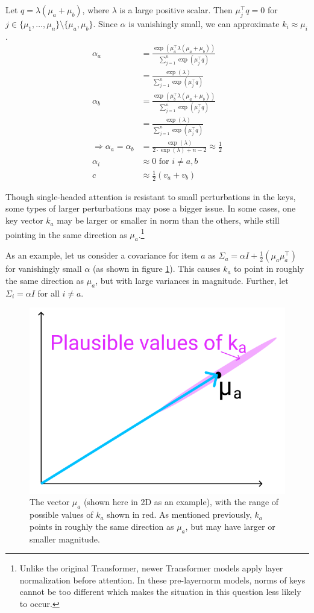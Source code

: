 \begin{parts}
\begin{subparts}
\ifans{} Let $q = \lambda(\mu_a + \mu_b)$, where $\lambda$ is a large positive scalar. Then $\mu_j^\top q = 0$ for $j \in \{\mu_1, \ldots, \mu_n\} \setminus \{\mu_a, \mu_b\}$. 
Since $\alpha$ is vanishingly small, we can approximate $k_i \approx \mu_i$.
\begin{align*}
    \alpha_a &= \frac{\exp(\mu_a^\top \lambda (\mu_a + \mu_b))}{\sum_{j=1}^{n} \exp(\mu_j^\top q)} \\
    &= \frac{\exp(\lambda)}{\sum_{j=1}^{n} \exp(\mu_j^\top q)} \\
    \alpha_b &= \frac{\exp(\mu_b^\top \lambda (\mu_a + \mu_b))}{\sum_{j=1}^{n} \exp(\mu_j^\top q)} \\
    &= \frac{\exp(\lambda)}{\sum_{j=1}^{n} \exp(\mu_j^\top q)} \\
    \Rightarrow \alpha_a = \alpha_b &= \frac{\exp(\lambda)}{2 \cdot \exp(\lambda) + n - 2} \approx \frac{1}{2}\\
    \alpha_i &\approx 0 \textrm{ for } i \neq a, b \\
    c &\approx \frac{1}{2} (v_a + v_b)
\end{align*}

\subpart[3] Though single-headed attention is resistant to small perturbations in the keys, some types of larger perturbations may pose a bigger issue. In some cases, one key vector $k_a$ may be larger or smaller in norm than the others, while still pointing in the same direction as $\mu_a$.\footnote{Unlike the original Transformer, newer Transformer models apply layer normalization before attention. In these pre-layernorm models, norms of keys cannot be too different which makes the situation in this question less likely to occur.}

As an example, let us consider a covariance for item $a$ as $\Sigma_a = \alpha I + \frac{1}{2}(\mu_a\mu_a^\top)$ for vanishingly small $\alpha$ (as shown in figure \ref{ka_plausible}). This causes $k_a$ to point in roughly the same direction as $\mu_a$, but with large variances in magnitude. Further, let $\Sigma_i = \alpha I$ for all $i \neq a$.
\begin{figure}[h]
\centering
\captionsetup{justification=centering,margin=2cm}
\includegraphics[width=0.35\linewidth]{images/ka_plausible.png}
\caption{The vector $\mu_a$ (shown here in 2D as an example), with the range of possible values of $k_a$ shown in red. As mentioned previously, $k_a$ points in roughly the same direction as $\mu_a$, but may have larger or smaller magnitude.}
\label{ka_plausible}
\end{figure}


\end{subparts}
\end{parts}
